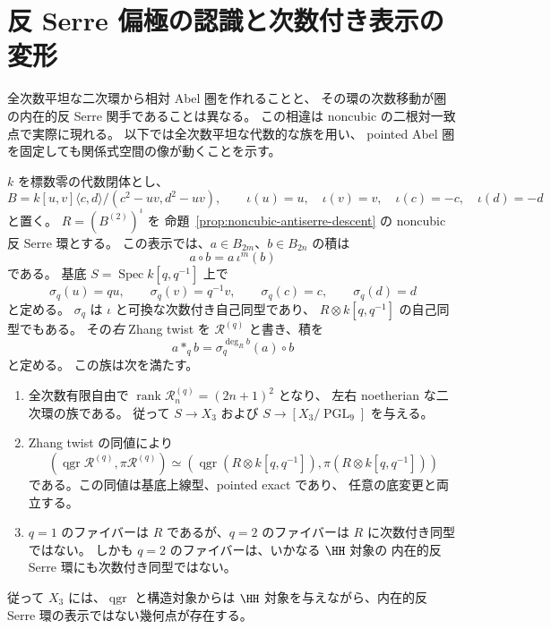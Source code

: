 \section{反 Serre 偏極の認識と次数付き表示の変形}
\label{sec:antiserre-polarization}

全次数平坦な二次環から相対 Abel 圏を作れることと、
その環の次数移動が圏の内在的反 Serre 関手であることは異なる。
この相違は noncubic の二根対一致点で実際に現れる。
以下では全次数平坦な代数的な族を用い、
pointed Abel 圏を固定しても関係式空間の像が動くことを示す。

\begin{proposition}
\label{prop:antiserre-polarization-family}
$k$ を標数零の代数閉体とし、
\[
 B=k[u,v]\langle c,d\rangle/(c^2-uv,d^2-uv),\qquad
 \iota(u)=u,\quad\iota(v)=v,\quad\iota(c)=-c,\quad\iota(d)=-d
\]
と置く。
$R=(B^{(2)})^{\iota}$ を
命題~\ref{prop:noncubic-antiserre-descent} の noncubic 反 Serre 環とする。
この表示では、$a\in B_{2m}$、$b\in B_{2n}$ の積は
\[
 a\mathbin{\circ} b=a\,\iota^m(b)
\]
である。
基底 $S=\operatorname{Spec}k[q,q^{-1}]$ 上で
\[
 \sigma_q(u)=qu,\qquad \sigma_q(v)=q^{-1}v,\qquad
 \sigma_q(c)=c,\qquad \sigma_q(d)=d
\]
と定める。
$\sigma_q$ は $\iota$ と可換な次数付き自己同型であり、
$R\otimes k[q,q^{-1}]$ の自己同型でもある。
その\emph{右} Zhang twist を $\mathcal R^{(q)}$ と書き、積を
\[
 a*_q b=\sigma_q^{\deg_R b}(a)\mathbin{\circ}b
 \tag{ZT}\label{eq:polarization-right-zhang}
\]
と定める。
この族は次を満たす。
\begin{enumerate}
\item 全次数有限自由で
$\operatorname{rank}\mathcal R^{(q)}_n=(2n+1)^2$ となり、
左右 noetherian な二次環の族である。
従って $S\to X_3$ および
$S\to[X_3/\operatorname{PGL}_9]$ を与える。
\item Zhang twist の同値により
\[
 (\operatorname{qgr}\mathcal R^{(q)},\pi\mathcal R^{(q)})
 \simeq
 (\operatorname{qgr}(R\otimes k[q,q^{-1}]),\pi(R\otimes k[q,q^{-1}]))
\]
である。この同値は基底上線型、pointed exact であり、
任意の底変更と両立する。
\item $q=1$ のファイバーは $R$ であるが、$q=2$ のファイバーは
$R$ に次数付き同型ではない。
しかも $q=2$ のファイバーは、いかなる $\HH$ 対象の
内在的反 Serre 環にも次数付き同型ではない。
\end{enumerate}
従って $X_3$ には、$\operatorname{qgr}$ と構造対象からは
$\HH$ 対象を与えながら、内在的反 Serre 環の表示ではない幾何点が存在する。
\end{proposition}
